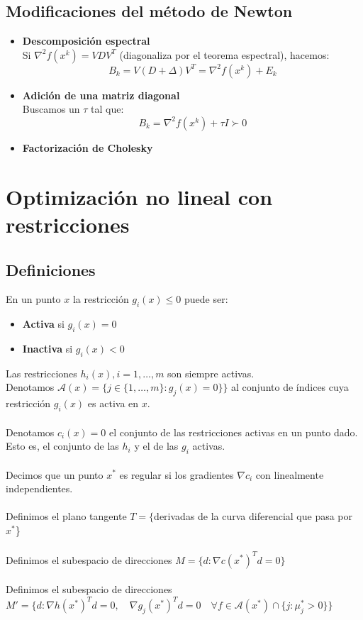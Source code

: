 \documentclass[leqno]{article}
\newcommand{\N}{\nabla}
\begin{document}
\subsection{Modificaciones del método de Newton}
\begin{itemize}
    \item \textbf{Descomposición espectral} \\
    Si $\N^2f(x^k) = VDV^T$ (diagonaliza por el teorema espectral), hacemos:
    $$
    B_k = V(D + \Delta) V^T = \N^2f(x^k) + E_k
    $$
    \item \textbf{Adición de una matriz diagonal}\\
    Buscamos un $\tau$ tal que:
    $$
    B_k = \N^2 f(x^k) + \tau I \succ 0
    $$
    \item \textbf{Factorización de Cholesky}
    
\end{itemize}

\section{Optimización no lineal con restricciones}
\subsection{Definiciones}
En un punto $x$ la restricción $g_i(x)\leq 0$ puede ser:
\begin{itemize}
    \item \textbf{Activa} si $g_i(x)=0$
    \item \textbf{Inactiva} si $g_i(x)<0$
\end{itemize}
Las restricciones $h_i(x), i=1, \ldots, m$ son siempre activas.\\
Denotamos $\mathcal{A}(x) = \{j\in \{1, \ldots, m\} : g_j(x)=0\}\}$ al conjunto de índices cuya restricción $g_i(x)$ es activa en $x$.\\
\\
Denotamos $c_i(x)=0$ el conjunto de las restricciones activas en un punto dado. Esto es, el conjunto de las $h_i$ y el de las $g_i$ activas. \\
\\
Decimos que un punto $x^*$ es regular si los gradientes $\nabla c_i$ con linealmente independientes.\\
\\
Definimos el plano tangente $T = \{$derivadas de la curva diferencial que pasa por $x^*$\} \\
\\
Definimos el subespacio de direcciones $M = \{d:\nabla c(x^*)^Td = 0\}$\\
\\
Definimos el subespacio de direcciones $M' = \{d:\nabla h(x^*)^Td = 0, \quad \nabla g_j(x^*)^Td = 0 \quad \forall f\in \mathcal{A}(x^*)\cap \{j: \mu_j^* > 0\} \}$
\end{document}
